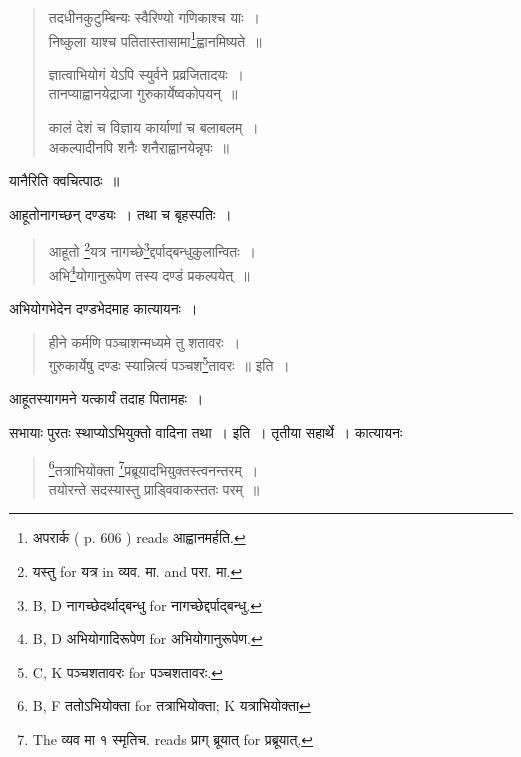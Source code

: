 \documentclass[11pt, openany]{book}
\begin{document}
\newpage
{}

\begin{quote}
{\vy तदधीनकुटुम्बिन्यः स्वैरिण्यो गणिकाश्च याः~।\\
निष्कुला याश्च पतितास्तासामा\renewcommand{\thefootnote}{1}\footnote{अपरार्क ( p. 606 ) reads आह्वानमर्हति.}ह्वानमिष्यते~॥

ज्ञात्वाभियोगं येऽपि स्युर्वने प्रव्रजितादयः~।\\
तानप्याह्वानयेद्राजा गुरुकार्येष्वकोपयन्~॥

कालं देशं च विज्ञाय कार्याणां च बलाबलम्~।\\
अकल्पादीनपि शनैः शनैराह्वानयेन्नृपः~॥}
\end{quote}

\noindent
यानैरिति क्वचित्पाठः~॥

आहूतोनागच्छन् दण्ड्यः~। तथा च बृहस्पतिः~।

\begin{quote}
{\vy आहूतो \renewcommand{\thefootnote}{2}\footnote{{\qt यस्तु} for यत्र in व्यव. मा. and परा. मा.}यत्र नागच्छे\renewcommand{\thefootnote}{3}\footnote{B, D नागच्छेदर्थाद्बन्धु for नागच्छेद्दर्पाद्बन्धु.}द्दर्पाद्बन्धुकुलान्वितः~।\\
अभि\renewcommand{\thefootnote}{4}\footnote{B, D अभियोगादिरूपेण for अभियोगानुरूपेण.}योगानुरूपेण तस्य दण्डं प्रकल्पयेत्~॥}
\end{quote}

अभियोगभेदेन दण्डभेदमाह कात्यायनः~।

\begin{quote}
{\vy हीने कर्मणि पञ्चाशन्मध्यमे तु शतावरः~।\\
गुरुकार्येषु दण्डः स्यान्नित्यं पञ्चश\renewcommand{\thefootnote}{5}\footnote{C, K पञ्चशतावरः for पञ्चशतावरः.}तावरः~॥} इति~।
\end{quote}

\noindent
आहूतस्यागमने यत्कार्यं तदाह पितामहः~।

सभायाः पुरतः स्थाप्योऽभियुक्तो वादिना तथा~। इति~। तृतीया सहार्थे~। कात्यायनः

\begin{quote}
{\vy \renewcommand{\thefootnote}{6}\footnote{B, F ततोऽभियोक्ता for तत्राभियोक्ता; K यत्राभियोक्ता}तत्राभियोक्ता \renewcommand{\thefootnote}{7}\footnote{The व्यव मा १ स्मृतिच. reads प्राग् ब्रूयात् for प्रब्रूयात्.}प्रब्रूयादभियुक्तस्त्वनन्तरम्~।\\
तयोरन्ते सदस्यास्तु प्राड्विवाकस्ततः परम्~॥}
\end{quote}
\end{document}
